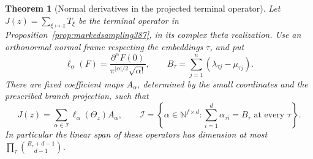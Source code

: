 \documentclass[a4paper,11pt]{article}
\newtheorem{theorem}[proposition]{Theorem}
\theoremstyle{definition}
\theoremstyle{remark}
\numberwithin{equation}{section}
\begin{document}
\begin{theorem}[Normal derivatives in the projected terminal operator]
\label{thm:normaljet388}
Let \(J(z)=\sum_{\xi\mapsto z}T_\xi\) be the terminal operator in
Proposition~\ref{prop:markedsampling387}, in its complex theta
realization. Use an orthonormal normal frame respecting the
embeddings \(\tau\), and put
\[
 \ell_\alpha(F)=
   \frac{\partial^\alpha F(0)}
        {\pi^{|\alpha|/2}\sqrt{\alpha!}},\qquad
 B_\tau=\sum_{j=1}^n(\lambda_{\tau j}-\mu_{\tau j}).
\]
There are fixed coefficient maps \(A_\alpha\), determined by the
small coordinates and the prescribed branch projection, such that
\[
   J(z)=\sum_{\alpha\in\mathcal I}\ell_\alpha(\Theta_z)A_\alpha,
   \qquad
   \mathcal I=
     \left\{\alpha\in\mathbb N^{f\times d}:
             \sum_{i=1}^d\alpha_{\tau i}=B_\tau
                         \text{ at every }\tau\right\}.
\]
In particular the linear span of these operators has dimension at
most \(\prod_\tau\binom{B_\tau+d-1}{d-1}\).
\end{theorem}
\end{document}
